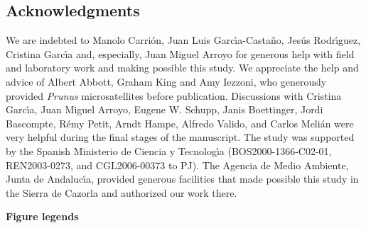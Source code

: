 \documentclass[a4paper,12pt]{article}
\begin{document}
\begin{bibunit}[science]
\begin{linenumbers}
\begin{spacing}{1.5}
\section*{Acknowledgments}
\label{sect:ackn} We are indebted to Manolo Carri\'{o}n, Juan Luis Garc\'{\i}a-Casta\~{n}o, Jes\'{u}s Rodr\'{\i}guez, Cristina Garc\'{\i}a and, especially, Juan Miguel Arroyo for generous help with field and laboratory work and making possible this study. We appreciate the help and advice of Albert Abbott, Graham King and Amy Iezzoni, who generously provided \textit{Prunus} microsatellites before publication. Discussions with Cristina Garc\'{\i}a, Juan Miguel Arroyo, Eugene W. Schupp, Janis Boettinger, Jordi Bascompte, R\'{e}my Petit, Arndt Hampe, Alfredo Valido, and Carlos Meli\'{a}n were very helpful during the final stages of the manuscript. The study was supported by the Spanish Ministerio de Ciencia y Tecnolog\'{\i}a (BOS2000-1366-C02-01, REN2003-0273, and CGL2006-00373 to PJ). The Agencia de Medio Ambiente, Junta de Andaluc\'{\i}a, provided generous facilities that made possible this study in the Sierra de Cazorla and authorized our work there.
\end{spacing}
%
\putbib[bu1]
\end{linenumbers}
\end{bibunit}

\label{sect:tabl}
\newpage

\textbf{Figure legends}\\
\end{document}
